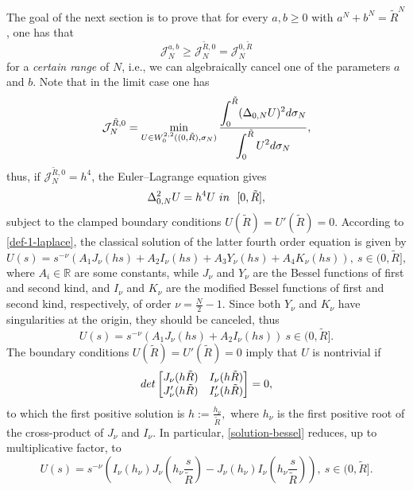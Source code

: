 \documentclass[11pt, reqno]{amsart}
\numberwithin{equation}{section}
\begin{document}
		The goal of the next section is to prove that for every $a,b\geq 0$ with $a^N+b^N=\tilde R^N$, one has that
		\begin{equation}\label{reduction}
		\mathcal 	J^{a,b}_N\geq \mathcal J^{\tilde R,0}_N = \mathcal J^{0,\tilde R}_N
		\end{equation}
		for a \textit{certain range} of $N$, i.e., we can algebraically cancel one of the parameters $a$ and $b$. Note that in the limit case one has
		\begin{equation}\label{minimizer}
			\mathcal J^{\tilde R,0}_N=\min_{U\in W^{2,2}_0((0,\tilde R),\sigma_N)} \frac{\displaystyle \int_{0}^{\tilde R} (\Delta_{0,N}U)^2{\rm d}\sigma_N }{\displaystyle\int_{0}^{\tilde R} U^2 {\rm d}\sigma_N},
		\end{equation}
		thus, if $\mathcal J^{\tilde R,0}_N=h^4$, the Euler--Lagrange equation gives 
		$$\Delta_{0,N}^2 U=h^4 U \ {\rm in} \ \  [0,\tilde R],$$
		subject to the clamped boundary conditions $U(\tilde R)=U'(\tilde R)=0.$  According to \eqref{def-1-laplace}, the classical solution of the latter fourth order equation is given by 
		$$U(s)=s^{-\nu}\left(A_1J_\nu(hs)+A_2I_\nu(hs)+A_3Y_\nu(hs)+A_4K_\nu(hs)\right),\ s\in(0,\tilde R],$$
		where $A_i\in \mathbb R$ are some constants, while $J_\nu$ and $Y_\nu$ are the Bessel functions of first and second kind,  and $I_\nu$ and $K_\nu$ are the modified Bessel functions of first and second kind, respectively, of order $\nu=\frac{N}{2}-1.$ Since both $Y_\nu$ and $K_\nu$ have singularities at the origin, they should be canceled, thus 
	\begin{equation}\label{solution-bessel}
		U(s)=s^{-\nu}(A_1J_\nu(hs)+A_2I_\nu(hs))\ s\in(0,\tilde R].
	\end{equation}
	The boundary conditions $U(\tilde R)=U'(\tilde R)=0$ imply that $U$ is nontrivial if \begin{equation}\label{determinant-0}
		{\rm det}\left[\begin{matrix}
			J_\nu(h\tilde R) & I_\nu(h\tilde R) \\
			J'_\nu(h\tilde R) & I'_\nu(h\tilde R)
		\end{matrix}\right]=0,
	\end{equation} 
	to which the first positive solution is $h:=\frac{h_\nu}{\tilde R},$ where $h_\nu$ is the first positive root of the cross-product   of $J_\nu$ and $I_\nu$. In particular, \eqref{solution-bessel} reduces, up to multiplicative factor, to 
	\begin{equation}\label{solution-bessel-0}
		U(s)=s^{-\nu}\left(I_\nu(h_\nu) J_\nu\left(h_\nu\frac{s}{\tilde R}\right)-J_\nu(h_\nu)I_\nu\left(h_\nu\frac{s}{\tilde R}\right)\right),\ s\in(0,\tilde R].
	\end{equation}
		
\end{document}
